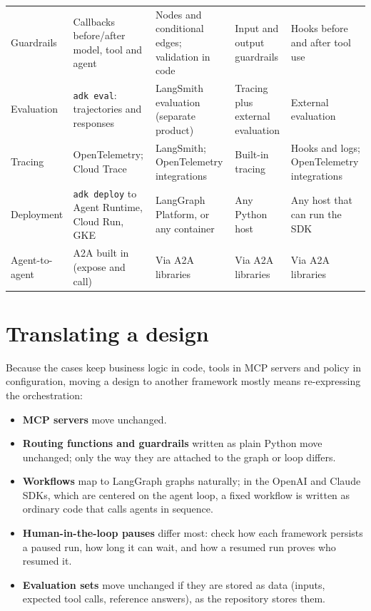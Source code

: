 \begin{table}[htbp]
\begin{tabularx}{\textwidth}{@{}>{\raggedright\arraybackslash}p{2.1cm}>{\raggedright\arraybackslash}X>{\raggedright\arraybackslash}X>{\raggedright\arraybackslash}X>{\raggedright\arraybackslash}X@{}}
Guardrails & Callbacks before/after model, tool and agent & Nodes and conditional edges; validation in code & Input and output guardrails & Hooks before and after tool use \\
Evaluation & \texttt{adk eval}: trajectories and responses & LangSmith evaluation (separate product) & Tracing plus external evaluation & External evaluation \\
Tracing & OpenTelemetry; Cloud Trace & LangSmith; OpenTelemetry integrations & Built-in tracing & Hooks and logs; OpenTelemetry integrations \\
Deployment & \texttt{adk deploy} to Agent Runtime, Cloud Run, GKE & LangGraph Platform, or any container & Any Python host & Any host that can run the SDK \\
Agent-to-agent & A2A built in (expose and call) & Via A2A libraries & Via A2A libraries & Via A2A libraries \\
\bottomrule
\end{tabularx}
\end{table}

\section{Translating a design}

Because the cases keep business logic in code, tools in MCP servers and policy in configuration, moving a design to another framework mostly means re-expressing the orchestration:
\begin{itemize}[itemsep=1pt]
  \item \textbf{MCP servers} move unchanged.
  \item \textbf{Routing functions and guardrails} written as plain Python move unchanged; only the way they are attached to the graph or loop differs.
  \item \textbf{Workflows} map to LangGraph graphs naturally; in the OpenAI and Claude SDKs, which are centered on the agent loop, a fixed workflow is written as ordinary code that calls agents in sequence.
  \item \textbf{Human-in-the-loop pauses} differ most: check how each framework persists a paused run, how long it can wait, and how a resumed run proves who resumed it.
  \item \textbf{Evaluation sets} move unchanged if they are stored as data (inputs, expected tool calls, reference answers), as the repository stores them.
\end{itemize}
